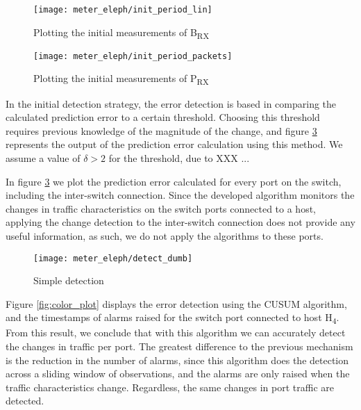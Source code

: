\begin{figure}[H]
    \centering
    \texttt{[image: meter\_eleph/init\_period\_lin]}
    \caption {Plotting the initial measurements of B\textsubscript{RX}}
    \label{fig:init_plot}
\end{figure} 

\begin{figure}[H]
    \centering
    \texttt{[image: meter\_eleph/init\_period\_packets]}
    \caption {Plotting the initial measurements of P\textsubscript{RX}}
    \label{fig:init_plot_pkts}
\end{figure} 

\par In the initial detection strategy, the error detection is based in comparing the calculated prediction error to a certain threshold. Choosing this threshold 
requires previous knowledge of the magnitude of the change, and figure \ref{fig:detect_dumb} represents the output of the prediction error calculation using this
method. We assume a value of $\delta > 2$ for the threshold, due to XXX ... 

\par In figure \ref{fig:detect_dumb} we plot the prediction error calculated for every port on the switch, including the inter-switch connection. Since the developed
algorithm monitors the changes in traffic characteristics on the switch ports connected to a host, applying the change detection to the inter-switch connection
does not provide any useful information, as such, we do not apply the algorithms to these ports.

\begin{figure}[H]
    \centering
    \texttt{[image: meter\_eleph/detect\_dumb]}
    \caption {Simple detection}
    \label{fig:detect_dumb}
\end{figure} 

\par Figure \ref{fig:color_plot} displays the error detection using the CUSUM algorithm, and the timestamps of alarms raised for the switch port connected to
host H\textsubscript{4}. From this result, we conclude that with this algorithm we can accurately detect the changes in traffic per port. The greatest difference to
the previous mechanism is the reduction in the number of alarms, since this algorithm does the detection across a sliding window of observations, and the alarms are
only raised when the traffic characteristics change. Regardless, the same changes in port traffic are detected.

